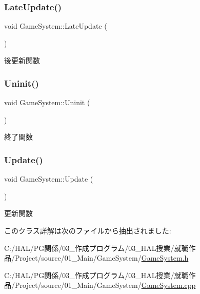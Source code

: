 \subsubsection{\texorpdfstring{Late\+Update()}{LateUpdate()}}
{\footnotesize\ttfamily void Game\+System\+::\+Late\+Update (\begin{DoxyParamCaption}{ }\end{DoxyParamCaption})}



後更新関数 

\mbox{\label{class_game_system_af76866bd03b84dca6880f1493fd3c9d1}} 
\subsubsection{\texorpdfstring{Uninit()}{Uninit()}}
{\footnotesize\ttfamily void Game\+System\+::\+Uninit (\begin{DoxyParamCaption}{ }\end{DoxyParamCaption})}



終了関数 

\mbox{\label{class_game_system_ab0add1f2bd97d3b125a5682f571053a3}} 
\subsubsection{\texorpdfstring{Update()}{Update()}}
{\footnotesize\ttfamily void Game\+System\+::\+Update (\begin{DoxyParamCaption}{ }\end{DoxyParamCaption})}



更新関数 



このクラス詳解は次のファイルから抽出されました\+:\begin{DoxyCompactItemize}
\item 
C\+:/\+H\+A\+L/\+P\+G関係/03\+\_\+作成プログラム/03\+\_\+\+H\+A\+L授業/就職作品/\+Project/source/01\+\_\+\+Main/\+Game\+System/\mbox{\hyperlink{_game_system_8h}{Game\+System.\+h}}\item 
C\+:/\+H\+A\+L/\+P\+G関係/03\+\_\+作成プログラム/03\+\_\+\+H\+A\+L授業/就職作品/\+Project/source/01\+\_\+\+Main/\+Game\+System/\mbox{\hyperlink{_game_system_8cpp}{Game\+System.\+cpp}}\end{DoxyCompactItemize}
